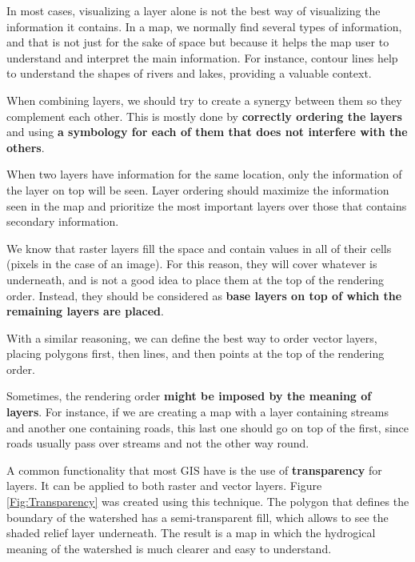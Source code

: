 In most cases, visualizing a layer alone is not the best way of visualizing the information it contains. In a map, we normally find several types of information, and that is not just for the sake of space but because it helps the map user to understand and interpret the main information. For instance, contour lines help to understand the shapes of rivers and lakes, providing a valuable context.

When combining layers, we should try to create a synergy between them so they complement each other. This is mostly done by \textbf{correctly ordering the layers} and using \textbf{a symbology for each of them that does not interfere with the others}.

When two layers have information for the same location, only the information of the layer on top will be seen. Layer ordering should maximize the information seen in the map and prioritize the most important layers over those that contains secondary information.

We know that raster layers fill the space and contain values in all of their cells (pixels in the case of an image). For this reason, they will cover whatever is underneath, and is not a good idea to place them at the top of the rendering order. Instead, they should be considered as \textbf{base layers on top of which the remaining layers are placed}.

With a similar reasoning, we can define the best way to order vector layers, placing polygons first, then lines, and then points at the top of the rendering order.

Sometimes, the rendering order \textbf{might be imposed by the meaning of layers}. For instance, if we are creating a map with a layer containing streams and another one containing roads, this last one should go on top of the first, since roads usually pass over streams and not the other way round.

A common functionality that most GIS have is the use of \textbf{transparency} for layers. It can be applied to both raster and vector layers. Figure \ref{Fig:Transparency} was created using this technique. The polygon that defines the boundary of the watershed has a semi-transparent fill, which allows to see the shaded relief layer underneath. The result is a map in which the hydrogical meaning of the watershed is much clearer and easy to understand.

